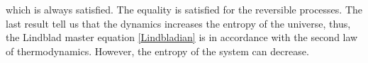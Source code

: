 which is always satisfied. The equality is satisfied for the reversible processes.
The last result tell us that the dynamics increases the entropy of the universe, thus, the Lindblad master equation \eqref{Lindbladian} is in accordance with the second law of thermodynamics. However, the entropy of the system can decrease.
